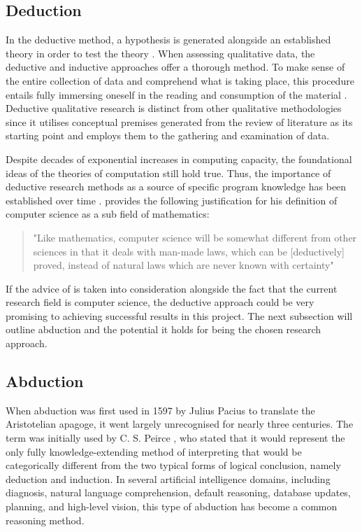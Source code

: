 {{\subsection{Deduction}
\par{In the deductive method, a hypothesis is generated alongside an established theory in order to test the theory \citep{saunders2009research}. When assessing qualitative data, the deductive and inductive approaches offer a thorough method. To make sense of the entire collection of data and comprehend what is taking place, this procedure entails fully immersing oneself in the reading and consumption of the material \citep{azungah2018qualitative}. Deductive qualitative research is distinct from other qualitative methodologies since it utilises conceptual premises generated from the review of literature as its starting point and employs them to the gathering and examination of data\citep{pearse2019illustration}.}
\par{Despite decades of exponential increases in computing capacity, the foundational ideas of the theories of computation still hold true. Thus, the importance of deductive research methods as a source of specific program knowledge has been established over time \citep{eden2007three}. \cite{knuth1968semantics} provides the following justification for his definition of computer science as a sub field of mathematics:}
\begin{quote}
"Like mathematics, computer science will be somewhat different from other sciences in that it deals with man-made laws, which can be [deductively] proved, instead of natural laws which are never known with certainty"
\end{quote}
\par{If the advice of \cite{knuth1968semantics} is taken into consideration alongside the fact that the current research field is computer science, the deductive approach could be very promising to achieving successful results in this project. The next subsection will outline abduction and the potential it holds for being the chosen research approach.}
\subsection{Abduction}
\par{When abduction was first used in 1597 by Julius Pacius to translate the Aristotelian apagoge, it went largely unrecognised for nearly three centuries. The term was initially used by C. S. Peirce \citep{smyth1999peirce}, who stated that it would represent the only fully knowledge-extending method of interpreting that would be categorically different from the two typical forms of logical conclusion, namely deduction and induction. In several artificial intelligence domains, including diagnosis, natural language comprehension, default reasoning, database updates, planning, and high-level vision, this type of abduction has become a common reasoning method.}
}}
